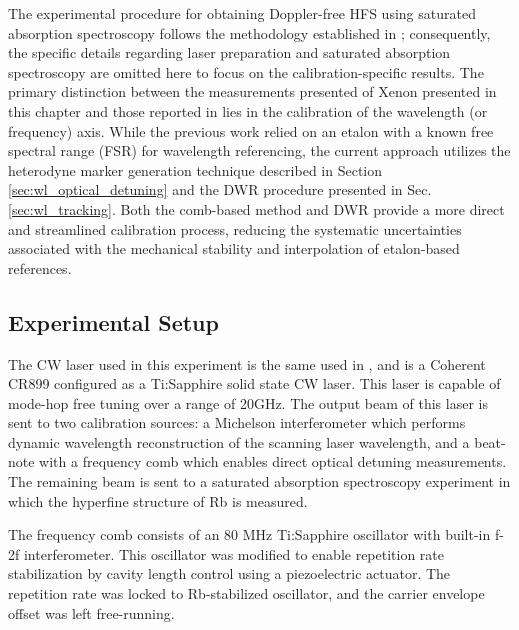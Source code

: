 \documentclass[8pt,a4paper]{report}
\begin{document}
	The experimental procedure for obtaining Doppler-free HFS using saturated absorption spectroscopy follows the methodology established in \cite{ours_xe_paper}; consequently, the specific details regarding laser preparation and saturated absorption spectroscopy are omitted here to focus on the calibration-specific results. The primary distinction between the measurements presented of Xenon presented in this chapter and those reported in \cite{ours_xe_paper} lies in the calibration of the wavelength (or frequency) axis. While the previous work relied on an etalon with a known free spectral range (FSR) for wavelength referencing, the current approach utilizes the heterodyne marker generation technique described in Section \ref{sec:wl_optical_detuning} and the DWR procedure presented in Sec. \ref{sec:wl_tracking}. Both the comb-based method and DWR provide a more direct and streamlined calibration process, reducing the systematic uncertainties associated with the mechanical stability and interpolation of etalon-based references.
	
	\subsection{Experimental Setup}
	
	The CW laser used in this experiment is the same used in \cite{ours_xe_paper}, and is a Coherent CR899 configured as a Ti:Sapphire solid state CW laser. This laser is capable of mode-hop free tuning over a range of 20GHz. The output beam of this laser is sent to two calibration sources: a Michelson interferometer which performs dynamic wavelength reconstruction of the scanning laser wavelength, and a beat-note with a frequency comb which enables direct optical detuning measurements. The remaining beam is sent to a saturated absorption spectroscopy experiment in which the hyperfine structure of Rb is measured.
	
	The frequency comb consists of an 80 MHz Ti:Sapphire oscillator with built-in f-2f interferometer. This oscillator was modified to enable repetition rate stabilization by cavity length control using a piezoelectric actuator. The repetition rate was locked to Rb-stabilized oscillator, and the carrier envelope offset was left free-running.
	
	
\end{document}
